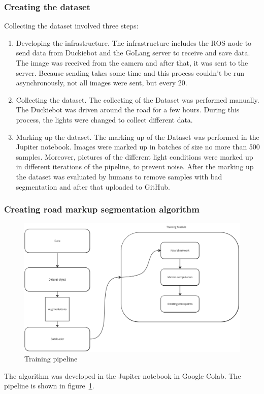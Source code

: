 \subsubsection{Creating the dataset}
Collecting the dataset involved three steps:
\begin{enumerate}
    \item Developing the infrastructure. The infrastructure includes the ROS node to send data from Duckiebot and the GoLang server to receive and save data. 
    The image was received from the camera and after that, it was sent to the server. Because sending takes some time and this process couldn't be run asynchronously,
    not all images were sent, but every 20.
    \item Collecting the dataset. The collecting of the Dataset was performed manually. The Duckiebot was driven around the road for a few hours. 
    During this process, the lights were changed to collect different data.
    \item Marking up the dataset. The marking up of the Dataset was performed in the Jupiter notebook. Images were marked up in batches of size no more than 500 samples.
    Moreover, pictures of the different light conditions were marked up in different iterations of the pipeline, to prevent noise. After the marking up the dataset was 
    evaluated by humans to remove samples with bad segmentation and after that uploaded to GitHub.
\end{enumerate}
\subsubsection{Creating road markup segmentation algorithm}
\begin{figure}[ht]
    \begin{center}
        \includegraphics[scale=0.25]{src/Design/assets/TrainingPipeline.png}
    \end{center}
    \caption{Training pipeline}\label{training_pipeline}
\end{figure}
The algorithm was developed in the Jupiter notebook in Google Colab. The pipeline is shown in figure~\ref{training_pipeline}.

